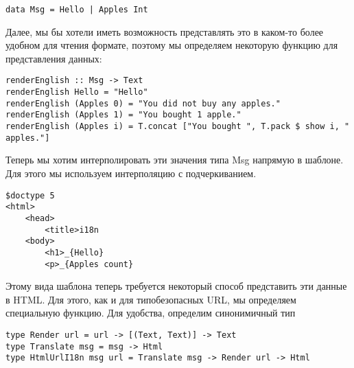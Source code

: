 \begin{lstlisting}
data Msg = Hello | Apples Int
\end{lstlisting}

Далее, мы бы хотели иметь возможность представлять это в каком-то более удобном
для чтения формате, поэтому мы определяем некоторую функцию для представления данных:
\begin{lstlisting}
renderEnglish :: Msg -> Text
renderEnglish Hello = "Hello"
renderEnglish (Apples 0) = "You did not buy any apples."
renderEnglish (Apples 1) = "You bought 1 apple."
renderEnglish (Apples i) = T.concat ["You bought ", T.pack $ show i, " apples."]
\end{lstlisting}

Теперь мы хотим интерполировать эти значения типа Msg напрямую в шаблоне.
Для этого мы используем интерполяцию с подчеркиванием.

\begin{lstlisting}
$doctype 5
<html>
    <head>
        <title>i18n
    <body>
        <h1>_{Hello}
        <p>_{Apples count}
\end{lstlisting}

Этому вида шаблона теперь требуется некоторый способ представить эти данные в HTML.
Для этого, как и для типобезопасных URL, мы определяем специальную функцию.
Для удобства, определим синонимичный тип

\begin{lstlisting}
type Render url = url -> [(Text, Text)] -> Text
type Translate msg = msg -> Html
type HtmlUrlI18n msg url = Translate msg -> Render url -> Html
\end{lstlisting}

